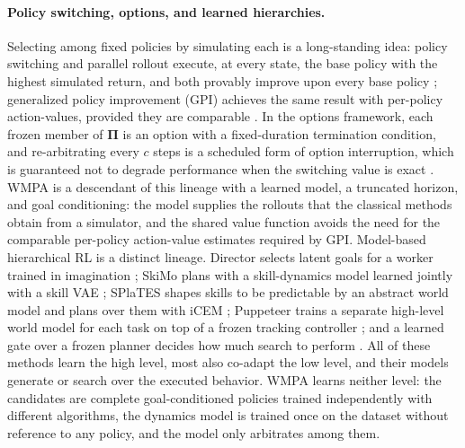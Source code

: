 \documentclass{article}
\theoremstyle{plain}
\theoremstyle{definition}
\theoremstyle{plain}
\newcommand{\wmpa}{\textsc{WMPA}}
\begin{document}
\paragraph{Policy switching, options, and learned hierarchies.}
Selecting among fixed policies by simulating each is a long-standing idea: policy switching and parallel rollout execute, at every state, the base policy with the highest simulated return, and both provably improve upon every base policy \citep{chang2004parallel,bertsekas1999rollout}; generalized policy improvement (GPI) achieves the same result with per-policy action-values, provided they are comparable \citep{barreto2017successor}. In the options framework, each frozen member of $\mathbf{\Pi}$ is an option with a fixed-duration termination condition, and re-arbitrating every $c$ steps is a scheduled form of option interruption, which is guaranteed not to degrade performance when the switching value is exact \citep{sutton1999between}. \wmpa{}
is a descendant of this lineage with a learned model, a truncated horizon, and goal conditioning: the model supplies the rollouts that the classical methods obtain from a simulator, and the shared value function avoids the need for the comparable per-policy action-value estimates required by GPI.
Model-based hierarchical RL is a distinct lineage. Director selects latent goals for a worker trained in imagination \citep{hafner2022director}; SkiMo plans with a skill-dynamics model learned jointly with a skill VAE \citep{shi2022skimo}; SPlaTES shapes skills to be predictable by an abstract world model and plans over them with iCEM \citep{gurtler2025splates}; Puppeteer trains a separate high-level world model for each task on top of a frozen tracking controller \citep{hansen2025puppeteer}; and a learned gate over a frozen planner decides how much search to perform \citep{muppidi2026finding}. All of these methods learn the high level, most also co-adapt the low level, and their models generate or search over the executed behavior. \wmpa{} learns neither level: the candidates are complete goal-conditioned policies trained independently with different algorithms, the dynamics model is trained once on the dataset without reference to any policy, and the model only arbitrates among them.
\end{document}
